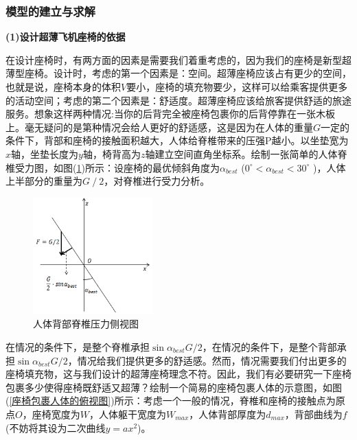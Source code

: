         \subsubsection{模型的建立与求解}
            \par
            \textbf{(1)设计超薄飞机座椅的依据}
            \par
            在设计座椅时，有两方面的因素是需要我们着重考虑的，因为我们的座椅是新型超薄型座椅。设计时，考虑的第一个因素是：空间。超薄座椅应该占有更少的空间，也就是说，座椅本身的体积$V$要小，座椅的填充物要少，这样可以给乘客提供更多的活动空间；考虑的第二个因素是：舒适度。超薄座椅应该给旅客提供舒适的旅途服务。想象这样两种情况:当你的后背完全被座椅包裹你的后背停靠在一张木板上。毫无疑问的是第种情况会给人更好的舒适感，这是因为在人体的重量$G$一定的条件下，背部和座椅的接触面积越大，人体给脊椎带来的压强P越小。以坐垫宽为$x$轴，坐垫长度为$y$轴，椅背高为$z$轴建立空间直角坐标系。绘制一张简单的人体脊椎受力图，如图(\ref{人体背部脊椎压力侧视图})所示：设座椅的最优倾斜角度为$\alpha_{best}$ ($0^\circ<\alpha_{best}<30^\circ$ )，人体上半部分的重量为$G⁄2$，对脊椎进行受力分析。
            \begin{figure}[H]
            \centering
            \includegraphics[height = 4.5cm]{images/body_back_spine_pressure_side_view.jpg}
            \caption{人体背部脊椎压力侧视图}
            \label{人体背部脊椎压力侧视图}
            \end{figure}
            \par
            在情况的条件下，是整个脊椎承担$\sin \alpha_{best}G/2$，在情况的条件下，是整个背部承担$\sin \alpha_{best}G/2$，情况给我们提供更多的舒适感。然而，情况需要我们付出更多的座椅填充物，这与我们设计的超薄座椅理念不符。因此，我们有必要研究一下座椅包裹多少使得座椅既舒适又超薄？绘制一个简易的座椅包裹人体的示意图，如图(\ref{座椅包裹人体的俯视图})所示：考虑一个一般的情况，脊椎和座椅的接触点为原点$O$，座椅宽度为$W$，人体躯干宽度为$W_{max}$，人体背部厚度为$d_{max}$，背部曲线为$f$(不妨将其设为二次曲线$y=ax^2$)。
